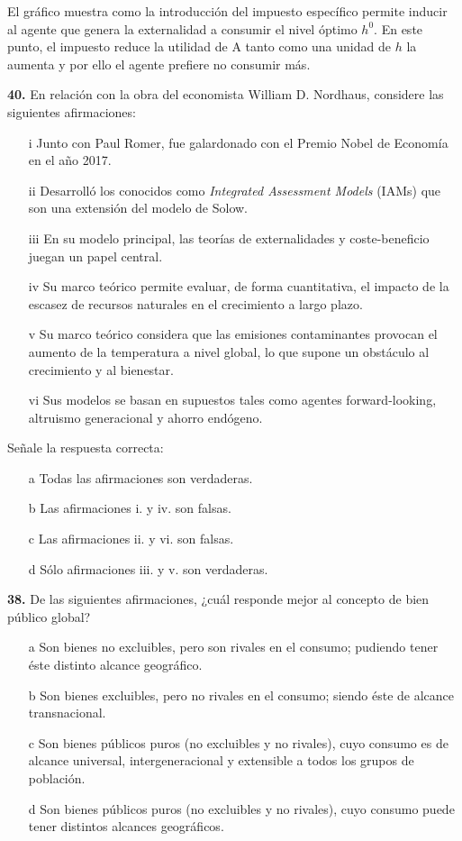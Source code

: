 \documentclass{nuevotema}
\begin{document}
El gráfico muestra como la introducción del impuesto específico permite inducir al agente que genera la externalidad a consumir el nivel óptimo $h^0$. En este punto, el impuesto reduce la utilidad de A tanto como una unidad de $h$ la aumenta y por ello el agente prefiere no consumir más.


\preguntas


\textbf{40.} En relación con la obra del economista William D. Nordhaus, considere las siguientes afirmaciones:

\begin{itemize}
	\item[i] Junto con Paul Romer, fue galardonado con el Premio Nobel de Economía en el año 2017.
	\item[ii] Desarrolló los conocidos como \textit{Integrated Assessment Models} (IAMs) que son una extensión del modelo de Solow.
	\item[iii] En su modelo principal, las teorías de externalidades y coste-beneficio juegan un papel central.
	\item[iv] Su marco teórico permite evaluar, de forma cuantitativa, el impacto de la escasez de recursos naturales en el crecimiento a largo plazo.
	\item[v] Su marco teórico considera que las emisiones contaminantes provocan el aumento de la temperatura a nivel global, lo que supone un obstáculo al crecimiento y al bienestar.
	\item[vi] Sus modelos se basan en supuestos tales como agentes forward-looking, altruismo generacional y ahorro endógeno.
\end{itemize}

Señale la respuesta correcta:

\begin{itemize}
	\item[a] Todas las afirmaciones son verdaderas.
	\item[b] Las afirmaciones i. y iv. son falsas.
	\item[c] Las afirmaciones ii. y vi. son falsas.
	\item[d] Sólo afirmaciones iii. y v. son verdaderas.
\end{itemize}



\textbf{38.} De las siguientes afirmaciones, ¿cuál responde mejor al concepto de bien público global?

\begin{itemize}
	\item[a] Son bienes no excluibles, pero son rivales en el consumo; pudiendo tener éste distinto alcance geográfico.
	\item[b] Son bienes excluibles, pero no rivales en el consumo; siendo éste de alcance transnacional.
	\item[c] Son bienes públicos puros (no excluibles y no rivales), cuyo consumo es de alcance universal, intergeneracional y extensible a todos los grupos de población.
	\item[d] Son bienes públicos puros (no excluibles y no rivales), cuyo consumo puede tener distintos alcances geográficos.
\end{itemize}
\end{document}
